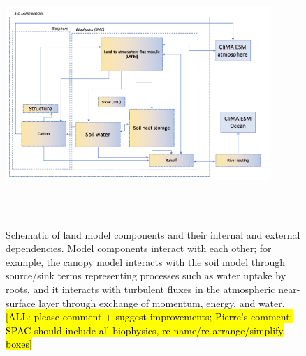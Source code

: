 \documentclass{report}
\begin{document}
\begin{figure}[htb]
\includegraphics[width=10cm,height=10cm,keepaspectratio]{CLIMA-land/LM_figures/JPLCLIMA_LM_DESIGN_20191115.png}
\caption{Schematic of land model components and their internal and external dependencies. Model components interact with each other; for example, the canopy model interacts with the soil model through source/sink terms representing processes such as water uptake by roots, and it interacts with turbulent fluxes in the atmospheric near-surface layer through exchange of momentum, energy, and water. \hl{[ALL: please comment + suggest improvements; Pierre's comment: SPAC should include all biophysics, re-name/re-arrange/simplify boxes]}}
\label{f:land_model_schematic}
\end{figure}
\end{document}
